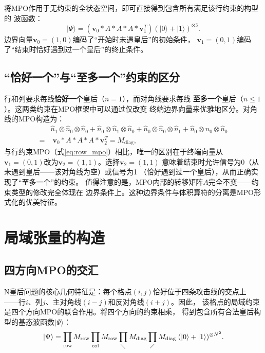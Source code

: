 将MPO作用于无约束的全状态空间，即可直接得到包含所有满足该行约束的构型的
波函数：
%
\begin{equation}
  |\Psi\rangle = (\mathbf{v}_{0}*A*A*A*\mathbf{v}_{1}^{T})
                 (|0\rangle+|1\rangle)^{\otimes3}.
  \label{eq:row_wf}
\end{equation}
%
边界向量$\mathbf{v}_{0}=(1,0)$编码了``开始时未遇皇后''的初始条件，
$\mathbf{v}_{1}=(0,1)$编码了``结束时恰好遇到过一个皇后''的终止条件。

\subsection{``恰好一个''与``至多一个''约束的区分}

行和列要求每线\textbf{恰好一个}皇后（$n=1$），而对角线要求每线
\textbf{至多一个}皇后（$n\le1$）。这两类约束在MPO框架中可以通过仅改变
终端边界向量来优雅地区分。对角线的MPO构造为：
%
\begin{align}
  &\hat{n}_{1}\otimes\hat{n}_{0}\otimes\hat{n}_{0}
   +\hat{n}_{0}\otimes\hat{n}_{1}\otimes\hat{n}_{0}
   +\hat{n}_{0}\otimes\hat{n}_{0}\otimes\hat{n}_{1}
   +\hat{n}_{0}\otimes\hat{n}_{0}\otimes\hat{n}_{0}
   \nonumber\\
  =&\;\mathbf{v}_{0}*A*A*A*\mathbf{v}_{2}^{T}=M_{\text{diag}},
  \label{eq:diag_mpo}
\end{align}
%
与行约束MPO（式\ref{eq:row_mpo}）相比，唯一的区别在于终端向量从
$\mathbf{v}_{1}=(0,1)$改为$\mathbf{v}_{2}=(1,1)$。选择$\mathbf{v}_{2}=(1,1)$
意味着结束时允许信号为0（从未遇到皇后——该对角线为空）或信号为1
（恰好遇到过一个皇后），从而正确实现了``至多一个''的约束。
值得注意的是，MPO内部的转移矩阵$A$完全不变——约束类型的修改完全体现在
边界条件上。这种边界条件与体积算符的分离是MPO形式化的优美特征。

\section{局域张量的构造}

\subsection{四方向MPO的交汇}

N皇后问题的核心几何特征是：每个格点$(i,j)$恰好位于四条攻击线的交点上
——行$i$、列$j$、主对角线$(i-j)$和反对角线$(i+j)$。因此，
该格点的局域约束是四个方向MPO的联合作用。将四个方向的约束相乘，
得到包含所有合法皇后构型的基态波函数$|\Psi\rangle$：
%
\begin{equation}
  |\Psi\rangle = \prod_{\text{row}} M_{\text{row}}
                \prod_{\text{col}} M_{\text{row}}
                \prod_{\diagdown} M_{\text{diag}}
                \prod_{\diagup} M_{\text{diag}}
                \;(|0\rangle+|1\rangle)^{\otimes N^{2}}.
  \label{eq:psi_full}
\end{equation}

